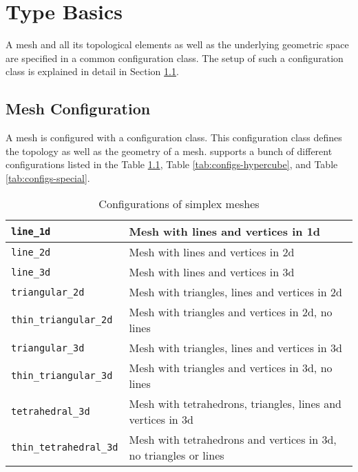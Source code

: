 \chapter{Type Basics} \label{chap:typebasics}

A mesh and all its topological elements as well as the underlying geometric space are specified in a common configuration class.
The setup of such a configuration class is explained in detail in Section \ref{sec:mesh-configuration}.

\section{Mesh Configuration} \label{sec:mesh-configuration}

A mesh is configured with a configuration class. This configuration class defines the topology as well as the geometry of a mesh.
{\ViennaGrid} supports a bunch of different configurations listed in the Table \ref{tab:configs-simplex}, Table \ref{tab:configs-hypercube}, and Table \ref{tab:configs-special}.


\begin{table}[tb]
  \begin{center}
    \begin{tabular}{|l|l|}
      \hline
      \lstinline|line_1d|   &  Mesh with lines and vertices in 1d  \\
      \hline
      \lstinline|line_2d|   &  Mesh with lines and vertices in 2d  \\
      \hline
      \lstinline|line_3d|   &  Mesh with lines and vertices in 3d  \\
      \hline
      \lstinline|triangular_2d|      &   Mesh with triangles, lines and vertices in 2d  \\
      \hline
      \lstinline|thin_triangular_2d| &   Mesh with triangles and vertices in 2d, no lines  \\
      \hline
      \lstinline|triangular_3d|      &   Mesh with triangles, lines and vertices in 3d  \\
      \hline
      \lstinline|thin_triangular_3d| &   Mesh with triangles and vertices in 3d, no lines  \\
      \hline
      \lstinline|tetrahedral_3d|     &   Mesh with tetrahedrons, triangles, lines and vertices in 3d  \\
      \hline
      \lstinline|thin_tetrahedral_3d| &   Mesh with tetrahedrons and vertices in 3d, no triangles or lines  \\
      \hline
    \end{tabular}
    \caption{Configurations of simplex meshes}
    \label{tab:configs-simplex}
  \end{center}
\end{table}



